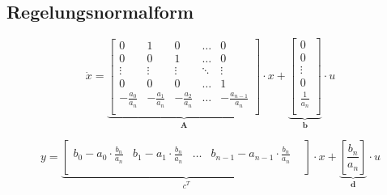 \subsection{Regelungsnormalform}
\[
	\dot x=
	\underbrace{
		\begin{bmatrix}
			0 &	1 & 0 & \ldots & 0\\
			0 & 0 & 1 & \ldots & 0\\
			\vdots & \vdots & \vdots & \ddots & \vdots \\
			0 & 0 & 0 & \ldots & 1\\
			-\frac{a_0}{a_n} &-\frac{a_1}{a_n} & -\frac{a_2}{a_n} & \ldots &-\frac{a_{n-1}}{a_n}\\	
		\end{bmatrix}
	}_{\textbf{A}}
	\cdot x +
	\underbrace{
		\begin{bmatrix}
			0 \\
			0 \\
			\vdots \\
			0 \\
			\frac{1}{a_n} \\	
		\end{bmatrix}
	}_{\textbf{b}}
	\cdot u	
\]

\[
	y=
	\underbrace{
			\begin{bmatrix}
				b_0-a_0\cdot\frac{b_n}{a_n} & b_1-a_1\cdot\frac{b_n}{a_n} & \ldots & b_{n-1}-a_{n-1}\cdot\frac{b_n}{a_n} &\\
			\end{bmatrix}
	}_{\textbf{$c^T$}}
	\cdot x  +
	\underbrace{
		\left[ \frac{b_n}{a_n} \right] 
	}_{\textbf{d}}
	\cdot u
\]